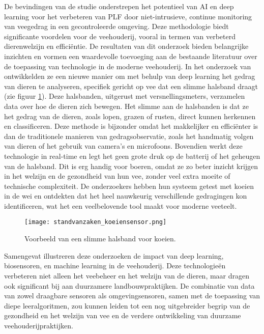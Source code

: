 De bevindingen van de studie onderstrepen het potentieel van AI en deep learning voor het verbeteren van PLF door niet-intrusieve, continue monitoring van veegedrag in een gecontroleerde omgeving. Deze methodologie biedt significante voordelen voor de veehouderij, vooral in termen van verbeterd dierenwelzijn en efficiëntie. De resultaten van dit onderzoek bieden belangrijke inzichten en vormen een waardevolle toevoeging aan de bestaande literatuur over de toepassing van technologie in de moderne veehouderij.
\newline
In het onderzoek van \textcite{ar5iv2021} ontwikkelden ze een nieuwe manier om met behulp van deep learning het gedrag van dieren te analyseren, specifiek gericht op vee dat een slimme halsband draagt (zie figuur \ref{fig:standvanzaken_koeiensensor}). Deze halsbanden, uitgerust met versnellingsmeters, verzamelen data over hoe de dieren zich bewegen. Het slimme aan de halsbanden is dat ze het gedrag van de dieren, zoals lopen, grazen of rusten, direct kunnen herkennen en classificeren.
Deze methode is bijzonder omdat het makkelijker en efficiënter is dan de traditionele manieren van gedragsobservatie, zoals het handmatig volgen van dieren of het gebruik van camera’s en microfoons. Bovendien werkt deze technologie in real-time en legt het geen grote druk op de batterij of het geheugen van de halsband. Dit is erg handig voor boeren, omdat ze zo beter inzicht krijgen in het welzijn en de gezondheid van hun vee, zonder veel extra moeite of technische complexiteit. De onderzoekers hebben hun systeem getest met koeien in de wei en ontdekten dat het heel nauwkeurig verschillende gedragingen kon identificeren, wat het een veelbelovende tool maakt voor moderne veeteelt.
\newline
\begin{figure}[H]
  \centering
  \texttt{[image: standvanzaken\_koeiensensor.png]}
  \caption{Voorbeeld van een slimme halsband voor koeien. \cite{ar5iv2021}}
  \label{fig:standvanzaken_koeiensensor}  
\end{figure}
\newline
Samengevat illustreren deze onderzoeken de impact van deep learning, biosensoren, en machine learning in de veehouderij. 
Deze technologieën verbeteren niet alleen het veebeheer en het welzijn van de dieren, maar dragen ook significant bij aan duurzamere landbouwpraktijken. 
De combinatie van data van zowel draagbare sensoren als omgevingsensoren, samen met de toepassing van diepe leeralgoritmen, zou kunnen leiden tot een nog uitgebreider begrip van de gezondheid en het welzijn van vee en de verdere ontwikkeling van duurzame veehouderijpraktijken.
